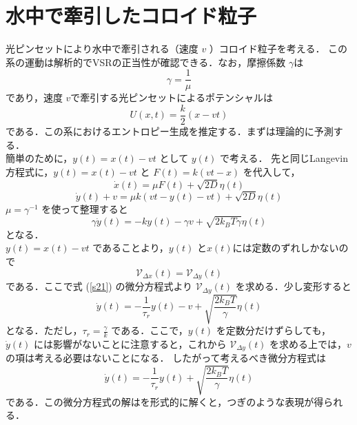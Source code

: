 \documentclass{jsarticle}
\numberwithin{equation}{section}
\theoremstyle{definition}
\begin{document}
\section{水中で牽引したコロイド粒子}
光ピンセットにより水中で牽引される（速度 $v$ ）コロイド粒子を考える．
この系の運動は解析的でVSRの正当性が確認できる．なお，摩擦係数 $\gamma $は
\begin{equation}
  \gamma = \frac{1}{\mu }
\end{equation}
であり，速度 $v$で牽引する光ピンセットによるポテンシャルは
\begin{equation}
  U(x, t) = \frac{k}{2} (x -vt)
\end{equation}
である．この系におけるエントロピー生成を推定する．まずは理論的に予測する．\\
\quad 簡単のために，$y(t) = x(t) - vt$ として $y(t)$ で考える．
先と同じLangevin方程式に，$y(t) = x(t) -vt$ と $F(t) = k(vt - x)$ を代入して，
\begin{equation}
  \dot{x} (t) = \mu F(t) + \sqrt{2D} \eta (t)
\end{equation}
\begin{equation}
  \dot{y}(t) + v = \mu k (vt - y(t) - vt) + \sqrt{2D} \eta(t)
\end{equation}
$\mu = \gamma^{-1}$ を使って整理すると
\begin{equation}
  \label{s21}
  \gamma \dot{y} (t) = -k y(t) - \gamma v + \sqrt{2 k_B T \gamma } \eta(t)
\end{equation}
となる．\\
\quad $y(t) = x(t) -vt$ であることより，$y(t)$ と$x(t)$には定数のずれしかないので
\begin{equation}
  \mathcal{V}_{\Delta x} (t) = \mathcal{V}_{\Delta y} (t)
\end{equation}
である．ここで式 (\ref{s21}) の微分方程式より $\mathcal{V}_{\Delta y} (t)$ を求める．少し変形すると
\begin{equation}
  \dot{y} (t) = - \frac{1}{\tau_r} y(t) - v + \sqrt{\frac{2 k_B T}{\gamma}} \eta(t)
\end{equation}
となる．ただし，$\tau_r = \frac{\gamma}{k}$ である．ここで，$y(t)$ を定数分だけずらしても，$\dot{y}(t)$ には影響がないことに注意すると，これから $\mathcal{V}_{\Delta y} (t)$ を求める上では，$v$ の項は考える必要はないことになる．
したがって考えるべき微分方程式は
\begin{equation}
  \dot{y} (t) = - \frac{1}{\tau_r} y(t) + \sqrt{\frac{2 k_B T}{\gamma}} \eta(t)
\end{equation}
である．この微分方程式の解はを形式的に解くと，つぎのような表現が得られる．
\end{document}
